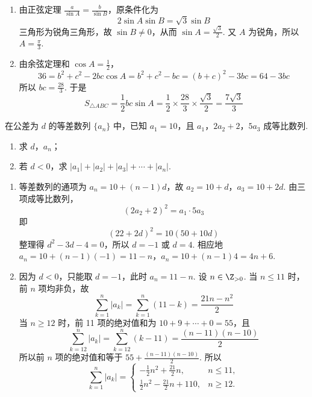 \begin{solution}
\begin{enumerate}
\item 由正弦定理 \(\frac{a}{\sin A}=\frac{b}{\sin B}\)，原条件化为
\[
2\sin A\sin B=\sqrt3\sin B
\]
三角形为锐角三角形，故 \(\sin B\ne0\)，从而 \(\sin A=\frac{\sqrt3}{2}\). 又 \(A\) 为锐角，所以 \(A=\frac{\pi}{3}\).

\item 由余弦定理和 \(\cos A=\frac12\)，
\[
36=b^2+c^2-2bc\cos A=b^2+c^2-bc=(b+c)^2-3bc=64-3bc
\]
所以 \(bc=\frac{28}{3}\). 于是
\[
S_{\triangle ABC}=\frac12bc\sin A
=\frac12\times\frac{28}{3}\times\frac{\sqrt3}{2}
=\frac{7\sqrt3}{3}
\]
\end{enumerate}
\end{solution}

\begin{problem}
在公差为 \(d\) 的等差数列 \(\{a_{n}\}\) 中，已知 \(a_1 = 10\)，且 \(a_1\)，\(2a_2 + 2\)，\(5a_3\) 成等比数列.
\begin{enumerate}
\item 求 \(d\)，\(a_{n}\)；
\item 若 \(d < 0\)，求 \( \left|a_{1}\right| + \left|a_{2}\right| + \left|a_{3}\right| + \cdots + \left|a_{n}\right| \).
\end{enumerate}
\end{problem}

\begin{solution}
\begin{enumerate}
\item 等差数列的通项为 \(a_n=10+(n-1)d\)，故 \(a_2=10+d\)，\(a_3=10+2d\). 由三项成等比数列，
\[
(2a_2+2)^2=a_1\cdot5a_3
\]
即
\[
(22+2d)^2=10(50+10d)
\]
整理得 \(d^2-3d-4=0\)，所以 \(d=-1\) 或 \(d=4\). 相应地
\(a_n=10+(n-1)(-1)=11-n\)，\(a_n=10+(n-1)4=4n+6\).

\item 因为 \(d<0\)，只能取 \(d=-1\)，此时 \(a_n=11-n\). 设 \(n\in\Z_{>0}\). 当 \(n\leqslant11\) 时，前 \(n\) 项均非负，故
\[
\sum_{k=1}^{n}|a_k|=\sum_{k=1}^{n}(11-k)=\frac{21n-n^2}{2}
\]
当 \(n\geqslant12\) 时，前 11 项的绝对值和为 \(10+9+\cdots+0=55\)，且
\[
\sum_{k=12}^{n}|a_k|=\sum_{k=12}^{n}(k-11)=\frac{(n-11)(n-10)}{2}
\]
所以前 \(n\) 项的绝对值和等于 \(55+\frac{(n-11)(n-10)}{2}\).
所以
\[
\sum_{k=1}^{n}|a_k|=
\begin{cases}
-\frac{1}{2}n^2+\frac{21}{2}n, & n\leqslant11,\\
\frac{1}{2}n^2-\frac{21}{2}n+110, & n\geqslant12.
\end{cases}
\]
\end{enumerate}
\end{solution}

